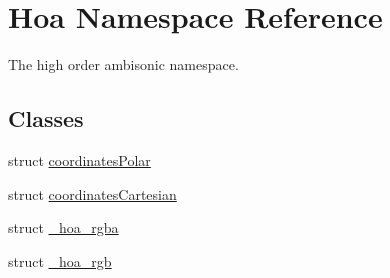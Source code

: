 \hypertarget{namespace_hoa}{\section{Hoa Namespace Reference}
\label{namespace_hoa}
}


The high order ambisonic namespace.  


\subsection*{Classes}
\begin{DoxyCompactItemize}
\item 
struct \hyperlink{struct_hoa_1_1coordinates_polar}{coordinates\-Polar}
\item 
struct \hyperlink{struct_hoa_1_1coordinates_cartesian}{coordinates\-Cartesian}
\item 
struct \hyperlink{struct_hoa_1_1__hoa__rgba}{\-\_\-hoa\-\_\-rgba}
\item 
struct \hyperlink{struct_hoa_1_1__hoa__rgb}{\-\_\-hoa\-\_\-rgb}
\end{DoxyCompactItemize}
